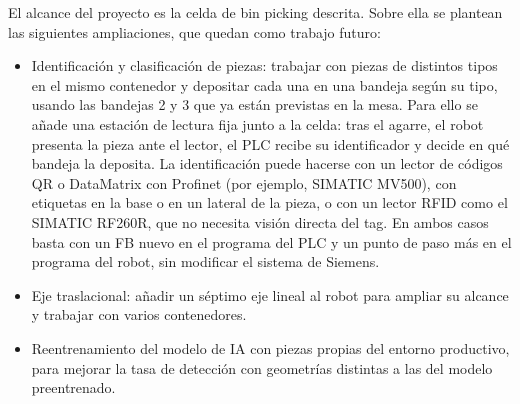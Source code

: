 El alcance del proyecto es la celda de bin picking descrita. Sobre ella se plantean las siguientes ampliaciones,
que quedan como trabajo futuro:

\begin{itemize}
	\item Identificación y clasificación de piezas: trabajar con piezas de distintos tipos en el mismo contenedor
	      y depositar cada una en una bandeja según su tipo, usando las bandejas 2 y 3 que ya están previstas en la
	      mesa. Para ello se añade una estación de lectura fija junto a la celda: tras el agarre, el robot presenta
	      la pieza ante el lector, el PLC recibe su identificador y decide en qué bandeja la deposita. La identificación puede hacerse con un lector de códigos QR o DataMatrix con
	      Profinet (por ejemplo, SIMATIC MV500), con etiquetas en la base o en un lateral de la pieza, o con un lector
	      RFID como el SIMATIC RF260R, que no necesita visión directa del tag. En ambos casos basta con un FB nuevo en
	      el programa del PLC y un punto de paso más en el programa del robot, sin modificar el sistema de Siemens.
	\item Eje traslacional: añadir un séptimo eje lineal al robot para ampliar su alcance y trabajar con varios
	      contenedores.
	\item Reentrenamiento del modelo de IA con piezas propias del entorno productivo, para mejorar la tasa de
	      detección con geometrías distintas a las del modelo preentrenado.
\end{itemize}
